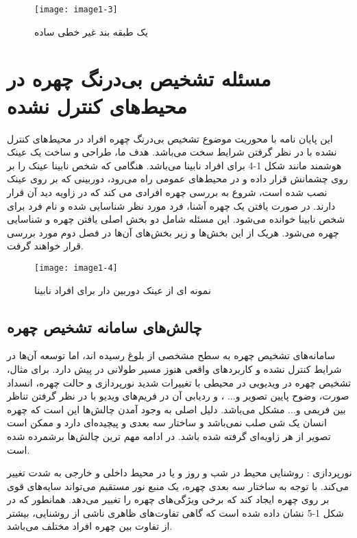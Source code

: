 \begin{figure}[h]
\centering
\texttt{[image: image1-3]}
\caption{ یک طبقه بند غیر خطی ساده \cite{ref19}}\label{image1-3}
\end{figure}

\section{مسئله تشخیص بی‌درنگ چهره در محیط‌های کنترل نشده}
این پایان نامه با محوریت موضوع تشخیص بی‌درنگ چهره افراد در محیط‌های کنترل نشده با در نظر گرفتن شرایط سخت می‌باشد. هدف ما، طراحی و ساخت یک عینک هوشمند مانند شکل 1-4 برای افراد نابینا می‌باشد. هنگامی که شخص نابینا عینک را بر روی چشمانش قرار داده و در محیط‌های عمومی راه می‌رود، دوربینی که بر روی عینک نصب شده است، شروع به بررسی چهره افرادی می کند که در زاویه دید آن قرار دارند. در صورت یافتن یک چهره آشنا، فرد مورد نظر شناسایی شده و نام فرد برای شخص نابینا خوانده می‌شود. این مسئله شامل دو بخش اصلی یافتن چهره و شناسایی چهره می‌شود. هریک از این بخش‌ها و زیر بخش‌های آن‌ها در فصل دوم مورد بررسی قرار خواهند گرفت.

\begin{figure}[!h]
\centering
\texttt{[image: image1-4]}
\caption{نمونه ای از عینک دوربین دار برای افراد نابینا \cite{ref13}}\label{image1-4}
\end{figure}


\subsection{چالش‌های سامانه تشخیص چهره}

سامانه‌های تشخیص چهره به سطح مشخصی از بلوغ رسیده اند، اما توسعه آن‌ها در شرایط کنترل نشده و کاربردهای واقعی هنوز مسیر طولانی در پیش دارد. برای مثال، تشخیص چهره در ویدیویی در محیطی با تغییرات شدید نورپردازی و حالت چهره، انسداد صورت، وضوح پایین تصویر و... ، و ردیابی آن در فریم‌های ویدیو با در نظر گرفتن تناظر بین فریمی و... مشکل می‌باشد. دلیل اصلی به وجود آمدن چالش‌ها این است که چهره انسان یک شی صلب نمی‌باشد و ساختار سه بعدی و پیچیده‌ای دارد و ممکن است تصویر از هر زاویه‌ای گرفته شده باشد. در ادامه مهم ترین چالش‌ها برشمرده شده است.

\noindent
نورپردازی : روشنایی محیط در شب و روز و یا در محیط داخلی و خارجی به شدت تغییر می‌کند. با توجه به ساختار سه بعدی چهره، یک منبع نور مستقیم می‌تواند سایه‌های قوی بر روی چهره ایجاد کند که برخی ویژگی‌های چهره را تغییر می‌دهد. همانطور که در شکل 1-5 نشان داده شده است که گاهی تفاوت‌های ظاهری ناشی از روشنایی، بیشتر از تفاوت بین چهره افراد مختلف می‌باشد.

